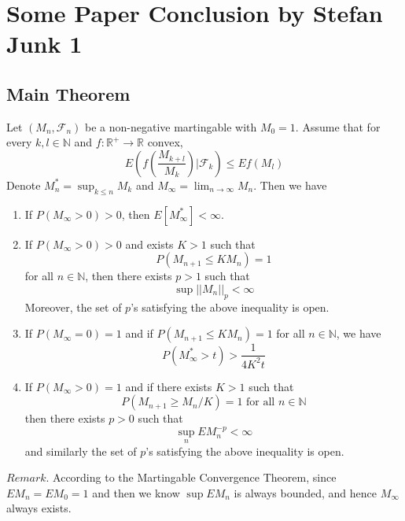 \section{Some Paper Conclusion by Stefan Junk 1}

\subsection{Main Theorem}

\begin{theorem}
    Let $(M_n,\mathcal{F}_n)$ be a non-negative martingable with $M_0 = 1$. Assume that for every $k,l\in\mathbb{N}$ and $f:\mathbb{R}^+\to \mathbb{R}$ convex,
    \[
    E\left(f\left(\dfrac{M_{k+l}}{M_k}\right)|\mathcal{F}_k\right) \leq Ef(M_l)
    \]
    Denote $M_n^* = \sup_{k\leq n} M_k$ and $M_{\infty} = \lim_{n\to\infty} M_n$. Then we have
    \begin{enumerate}
        \item If $P(M_{\infty} > 0)>0$, then $E[M^*_{\infty}] < \infty$.
        \item If $P(M_{\infty} > 0) >0$ and exists $K>1$ such that
        \[P(M_{n+1} \leq KM_n) = 1\]
        for all $n\in\mathbb{N}$, then there exists $p>1$ such that
        \[
        \sup ||M_n||_p < \infty
        \]
        Moreover, the set of $p$'s satisfying the above inequality is open.
        \item If $P(M_{\infty} = 0) = 1$ and if $P(M_{n+1} \leq KM_n) = 1$ for all $n\in\mathbb{N}$, we have
        \[P(M_{\infty}^*>t) > \dfrac{1}{4K^2t} \]
        \item If $P(M_{\infty} > 0) = 1$ and if there exists $K>1$ such that
        \[P(M_{n+1} \geq M_n/K) = 1\text{ for all }n\in\mathbb{N}\]
        then there exists $p>0$ such that
        \[
        \sup_n EM_n^{-p} < \infty
        \]
        and similarly the set of $p$'s satisfying the above inequality is open.
    \end{enumerate}
\end{theorem}
$Remark$. According to the Martingable Convergence Theorem, since $EM_n = EM_0 = 1$ and then we know $\sup EM_n$ is always bounded, and hence $M_{\infty}$ always exists.

